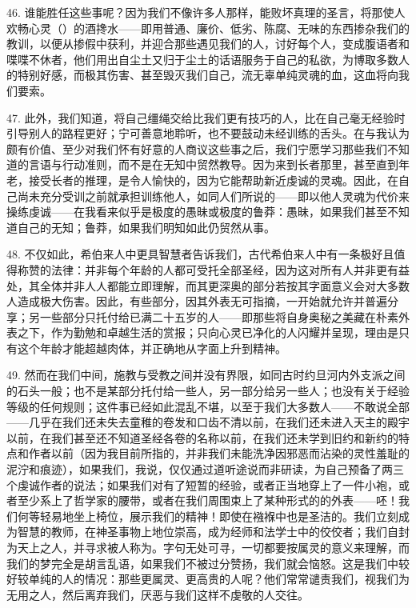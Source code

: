 46. 谁能胜任这些事呢？因为我们不像许多人那样，能败坏真理的圣言，将那使人欢畅心灵（）的酒搀水——即用普通、廉价、低劣、陈腐、无味的东西掺杂我们的教训，以便从掺假中获利，并迎合那些遇见我们的人，讨好每个人，变成腹语者和喋喋不休者，他们用出自尘土又归于尘土的话语服务于自己的私欲，为博取多数人的特别好感，而极其伤害、甚至毁灭我们自己，流无辜单纯灵魂的血，这血将向我们要索。\par

47. 此外，我们知道，将自己缰绳交给比我们更有技巧的人，比在自己毫无经验时引导别人的路程更好；宁可善意地聆听，也不要鼓动未经训练的舌头。在与我认为颇有价值、至少对我们怀有好意的人商议这些事之后，我们宁愿学习那些我们不知道的言语与行动准则，而不是在无知中贸然教导。因为来到长者那里，甚至直到年老，接受长者的推理，是令人愉快的，因为它能帮助新近虔诚的灵魂。因此，在自己尚未充分受训之前就承担训练他人，如同人们所说的——即以他人灵魂为代价来操练虔诚——在我看来似乎是极度的愚昧或极度的鲁莽：愚昧，如果我们甚至不知道自己的无知；鲁莽，如果我们明知如此仍贸然从事。\par

48. 不仅如此，希伯来人中更具智慧者告诉我们，古代希伯来人中有一条极好且值得称赞的法律：并非每个年龄的人都可受托全部圣经，因为这对所有人并非更有益处，其全体并非人人都能立即理解，而其更深奥的部分若按其字面意义会对大多数人造成极大伤害。因此，有些部分，因其外表无可指摘，一开始就允许并普遍分享；另一些部分只托付给已满二十五岁的人——即那些将自身奥秘之美藏在朴素外表之下，作为勤勉和卓越生活的赏报；只向心灵已净化的人闪耀并呈现，理由是只有这个年龄才能超越肉体，并正确地从字面上升到精神。\par

49. 然而在我们中间，施教与受教之间并没有界限，如同古时约旦河内外支派之间的石头一般；也不是某部分托付给一些人，另一部分给另一些人；也没有关于经验等级的任何规则；这件事已经如此混乱不堪，以至于我们大多数人——不敢说全部——几乎在我们还未失去童稚的卷发和口齿不清以前，在我们还未进入天主的殿宇以前，在我们甚至还不知道圣经各卷的名称以前，在我们还未学到旧约和新约的特点和作者以前（因为我目前所指的，并非我们未能洗净因邪恶而沾染的灵性羞耻的泥泞和痕迹），如果我们，我说，仅仅通过道听途说而非研读，为自己预备了两三个虔诚作者的说法；如果我们对有了短暂的经验，或者正当地穿上了一件小袍，或者至少系上了哲学家的腰带，或者在我们周围束上了某种形式的的外表——呸！我们何等轻易地坐上椅位，展示我们的精神！即使在襁褓中也是圣洁的。我们立刻成为智慧的教师，在神圣事物上地位崇高，成为经师和法学士中的佼佼者；我们自封为天上之人，并寻求被人称为。字句无处可寻，一切都要按属灵的意义来理解，而我们的梦完全是胡言乱语，如果我们不被过分赞扬，我们就会恼怒。这是我们中较好较单纯的人的情况：那些更属灵、更高贵的人呢？他们常常谴责我们，视我们为无用之人，然后离弃我们，厌恶与我们这样不虔敬的人交往。\par

